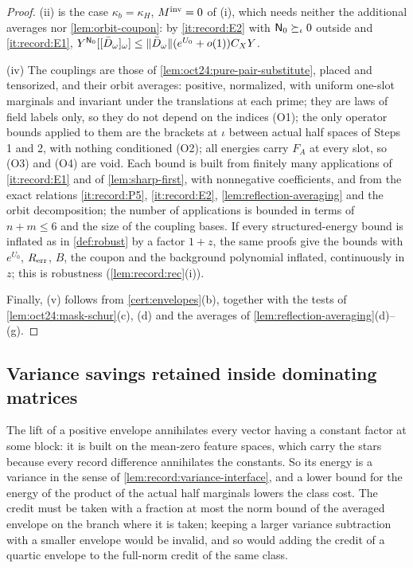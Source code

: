 \begin{proof}
(ii) is the case $\kappa_b=\kappa_H$, $M^{\rm inv}=0$ of (i), which needs neither the additional
averages nor \cref{lem:orbit-coupon}: by \ref{it:record:E2} with $\mathsf N_0\succeq_\iota0$
outside and \ref{it:record:E1},
$Y^{\mathsf N_0}[[\bar D_\omega]_\omega]\le\|\bar D_\omega\|(e^{U_0}+o(1))C_XY$.

(iv) The couplings are those of \cref{lem:oct24:pure-pair-substitute}, placed and
tensorized, and their orbit averages: positive, normalized, with uniform one-slot
marginals and invariant under the translations at each prime; they are laws of field
labels only, so they do not depend on the indices (O1); the only operator bounds
applied to them are the brackets at $\iota$ between actual half spaces of Steps 1
and 2, with nothing conditioned (O2); all energies carry $F_A$ at every slot, so
(O3) and (O4) are void. Each bound is built from finitely many applications of
\ref{it:record:E1} and of \cref{lem:sharp-first}, with nonnegative coefficients, and
from the exact relations \ref{it:record:P5}, \ref{it:record:E2},
\cref{lem:reflection-averaging} and the orbit decomposition; the number of
applications is bounded in terms of $n+m\le6$ and the size of the coupling bases. If
every structured-energy bound is inflated as in \cref{def:robust} by a factor $1+z$,
the same proofs give the bounds with $e^{U_0}$, $R_{\rm err}$, $B$, the coupon and the
background polynomial inflated, continuously in $z$; this is robustness
(\cref{lem:record:rec}(i)).

Finally, (v) follows from \cref{cert:envelopes}(b), together with the tests of
\cref{lem:oct24:mask-schur}(c), (d) and the averages of
\cref{lem:reflection-averaging}(d)--(g).
\end{proof}

\subsection{Variance savings retained inside dominating matrices}
\label{subsec:class-credit}

The lift of a positive envelope annihilates every vector having a constant factor at some block: it is built on the
mean-zero feature spaces, which carry the stars because every record difference
annihilates the constants. So its energy is
a variance in the sense of \cref{lem:record:variance-interface}, and a lower
bound for the energy of the product of the actual half marginals lowers the
class cost. The credit must be taken with a fraction at most the norm bound of
the averaged envelope on the branch where it is taken; keeping a larger variance
subtraction with a smaller envelope would be invalid, and so would adding the
credit of a quartic envelope to the full-norm credit of the same class.

